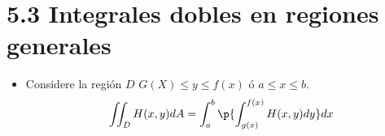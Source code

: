 \section{5.3 Integrales dobles en regiones generales}
\begin{itemize}
    \item Considere la región $D$ $\displaystyle G(X)\leq y \leq f(x)$ ó $\displaystyle a\leq x \leq b$.
        \[
          \iint_{D}^{}H(x,y)dA = \int_{a}^{b}\p{\int_{g(x)}^{f(x)}H(x,y)dy} dx 
        \]
\end{itemize} 

